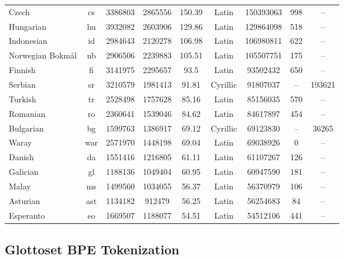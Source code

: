 \documentclass[11pt]{article}
\begin{document}
\begin{table}[ht]
\begin{tabular}{l c c c c c c c c}
        Czech & cs & 3386803 & 2865556 & 150.39 & Latin & 150393063 & 998 & -- \\
        Hungarian & hu & 3932082 & 2603906 & 129.86 & Latin & 129864098 & 518 & -- \\
        Indonesian & id & 2984643 & 2120278 & 106.98 & Latin & 106980811 & 622 & -- \\
        Norwegian Bokm\aa l & nb & 2906506 & 2239883 & 105.51 & Latin & 105507751 & 175 & -- \\
        Finnish & fi & 3141975 & 2295657 & 93.5 & Latin & 93502432 & 650 & -- \\
        Serbian & sr & 3210579 & 1981413 & 91.81 & Cyrillic & 91807037 & -- & 193621 \\
        Turkish & tr & 2528498 & 1757628 & 85.16 & Latin & 85156035 & 570 & -- \\
        Romanian & ro & 2360641 & 1539046 & 84.62 & Latin & 84617897 & 454 & -- \\
        Bulgarian & bg & 1599763 & 1386917 & 69.12 & Cyrillic & 69123830 & -- & 36265 \\
        Waray & war & 2571970 & 1448198 & 69.04 & Latin & 69038926 & 0 & -- \\
        Danish & da & 1551416 & 1216805 & 61.11 & Latin & 61107267 & 126 & -- \\
        Galician & gl & 1188136 & 1049404 & 60.95 & Latin & 60947590 & 181 & -- \\
        Malay & ms & 1499560 & 1034055 & 56.37 & Latin & 56370979 & 106 & -- \\
        Asturian & ast & 1134182 & 912479 & 56.25 & Latin & 56254683 & 84 & -- \\
        Esperanto & eo & 1669507 & 1188077 & 54.51 & Latin & 54512106 & 441 & -- \\
        \bottomrule
    \end{tabular}
\end{table}


\subsection{Glottoset BPE Tokenization}
\label{sec:bpe}
\end{document}
